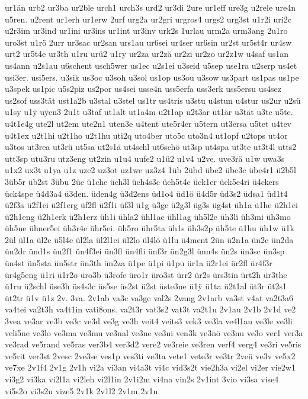 {ur1än
urb2
ur3ba
ur2ble
urch1
urch3s
urd2
ur3di
2ure
ur1eff
ure3g
u2rele
ure4n
u5ren.
u2rent
ur1erh
ur1erw
2urf
urg2a
ur2gri
urgros4
urgs2
urg3st
u1r2i
uri2c
u2r3im
ur3ind
ur1ini
ur3ins
ur1int
ur3inv
urk2s
1urlau
urm2a
urm3ang
2u1ro
uro3st
u1rö
2urr
ur3sac
ur2san
urs1au
ur6sei
ur4ser
ur6sin
ur2st
ur5st4r
ur4sw
urt2
ur5t4e
ur3th
u1ru
urü2
u1ry
ur2za
ur2zä
ur2zi
ur2zo
ur2z1w
u4saf
us1an
us4ann
u2s1au
u6schent
usch5wer
us1ec
u2s1ei
u3seid
u5sep
use1ra
u2serp
us4et
usi3er.
usi5ers.
u3sik
us3oc
u3soh
u3sol
us1op
us3ou
u3sow
us3part
us1pas
us1pe
u3spek
us1pic
u5s2piz
us2por
us4sei
usse4n
uss5erfa
uss3erk
uss5ersu
us4sez
us2sof
uss3tät
ust1a2b
u3stal
u3stel
us1tr
us4tris
u3stu
u4stun
u4stur
us2ur
u2sü
u1sy
u1^^ff
u^^ffen3
2u1t
u3taf
ut1alt
ut1a4m
u2t1ap
u2t3ar
ut1är
u3tät
u3te
u5te.
u4t1e4g
ute2l
ut2em
ute2n1
uten3e
u4tent
ute5r4er
u5tern
ut3ersa
u5tet
u4tev
u4t1ex
u2t1hi
u2t1ho
u2t1hu
uti2q
uto4ber
uto5c
uto3n4
ut1opf
u2tops
ut4or
u3tos
ut3rea
ut3rü
ut5sa
ut2s1ä
ut4schl
ut6schö
ut3sp
ut4spa
ut3te
ut3t4l
utts2
utt3sp
utu3ru
utz3eng
ut2zin
u1u4
uufe2
u1ü2
u1v4
u2ve.
uve3rä
u1w
uwa3s
u1x2
ux3t
u1ya
u1z
uze2
uz3ot
uz1we
uz3z4
1üb
2übd
übe2
übe3c
übe4r1
ü2b5l
3üb5r
üb2st
3übu
2üc
ü1che
üch3l
üch4s3c
üch5t4e
ück1er
ück5e4ri
ü4ckers
ück4spe
ü4d3a4
ü3den.
üden4g
ü3d2ens
üd1o4
üd1ö
ü4d5r
üd3s2
üdsa1
üd1t4
ü2f3a
ü2f1ei
ü2f1erg
üf2fl
ü2f1i
üf3l
ü1g
ü3ge
ü2g3l
üg3s
üg4st
üh1a
ü1he
ü2h1ei
ü2h1eng
ü2h1erk
ü2h1erz
üh1i
ühla2
ühl1ac
ühl1ag
üh5l2e
üh3li
üh3mi
üh3mo
üh5ne
ühner5ei
üh3r4e
ühr5ei.
üh5ro
ühr5ta
üh1s
üh3s2p
üh5te
ü1hu
üh1w
ü1k
2ül
ül1a
ül2c
ü5l4e
ül2la
ül2l1ei
ül2lo
ül4lö
ü1lu
ü4ment
2ün
ü2n1a
ün2c
ün2da
ün2dr
ünd1s
ün2f1
ün4f3ei
ün3fl
ün4fli
ünf3r
ün2g3l
ünn4s
ün2s
ün3sc
ün3sp
ün4st
ün5sta
ün5str
ün3th
ün2za
ü1pe
ü1pi
ü1pu
ür1a
ü2r1ei
ür2fl
ür4f3r
ür4g5eng
ü1ri
ü1r2o
üro3b
ü3rofe
üro1r
üro3st
ürr2
ür2s
ürs3tin
ürt2h
ür3the
ü1ru
ü2schl
üse3h
üs4s3c
üs5se
üs2st
ü2st
üste3ne
ü1^^ff
ü1ta
ü2t1al
üt3r
üt2s1
üt2tr
ü1v
ü1z
2v.
3va.
2v1ab
va3c
va3ge
val2s
2vang
2v1arb
va3st
v4at
va2t3a6
va4tei
va2t3h
va4t1in
vati8ons.
va2t3r
vat3s2
vat3t
va2t1u
2v1au
2v1b
2v1d
ve2
3vea
ve3ar
ve3b
ve3c
ve3d
ve3g
ve3h
veit4
veits3
vek3
ve3la
ve4l1au
ve3le
ve3li
veli5ne
ve3lo
ve3ma
ve3mu
ve3nal
ve3ne
ve3ni
ven3k
ve3nö
ve3nu
ve3o
ver1
ver3a
ve3rad
ve5rand
ve5ras
ver3b4
ver3d2
vere2
ve3reie
ve3ren
verf4
verg4
ve3ri
ve5ris
ve5rit
ver3st
2vesc
2ve3se
ves1p
ves3ti
ve3ta
vete1
vete3r
ve3tr
2veü
ve3v
ve5x2
ve7xe
2v1f4
2v1g
2v1h
vi2a
vi3an
vi4a3t
vi4c
vid3s2t
vie2h3a
vi2el
vi2er
vie2w1
vi3g2
vi3ka
vi2l1a
vi2leh
vi2l1in
2v1i2m
vi4na
vin2s
2v1int
3vio
vi3sa
vise4
vi5s2o
vi3s2u
vize5
2v1k
2v1l2
2v1m
2v1n
}

